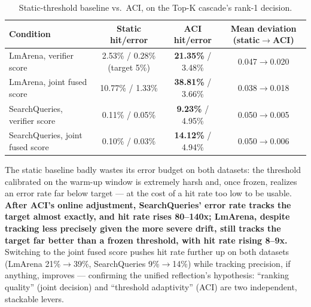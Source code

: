 \documentclass[11pt]{article}
\newenvironment{fittab}{\begin{lrbox}{\fittabbox}}{\end{lrbox}%
  \ifdim\wd\fittabbox>\linewidth\resizebox{\linewidth}{!}{\usebox{\fittabbox}}\else\usebox{\fittabbox}\fi}
\begin{document}
\begin{table}[h]
\centering
\small
\begin{fittab}\begin{tabular}{@{}lccc@{}}
\toprule
\textbf{Condition} & \textbf{Static hit/error} & \textbf{ACI hit/error} & \textbf{Mean deviation (static$\to$ACI)} \\
\midrule
LmArena, verifier score & 2.53\% / 0.28\% (target 5\%) & \textbf{21.35\%} / 3.48\% & 0.047$\to$0.020 \\
LmArena, joint fused score & 10.77\% / 1.33\% & \textbf{38.81\%} / 3.66\% & 0.038$\to$0.018 \\
SearchQueries, verifier score & 0.11\% / 0.05\% & \textbf{9.23\%} / 4.95\% & 0.050$\to$0.005 \\
SearchQueries, joint fused score & 0.10\% / 0.03\% & \textbf{14.12\%} / 4.94\% & 0.050$\to$0.006 \\
\bottomrule
\end{tabular}\end{fittab}
\caption{Static-threshold baseline vs.\ ACI, on the Top-K cascade's rank-1 decision.}
\end{table}

The static baseline badly wastes its error budget on both datasets: the threshold calibrated on the warm-up window is extremely harsh and, once frozen, realizes an error rate far below target --- at the cost of a hit rate too low to be usable. \textbf{After ACI's online adjustment, SearchQueries' error rate tracks the target almost exactly, and hit rate rises 80--140x; LmArena, despite tracking less precisely given the more severe drift, still tracks the target far better than a frozen threshold, with hit rate rising 8--9x.} Switching to the joint fused score pushes hit rate further up on both datasets (LmArena 21\%$\to$39\%, SearchQueries 9\%$\to$14\%) while tracking precision, if anything, improves --- confirming the unified reflection's hypothesis: ``ranking quality'' (joint decision) and ``threshold adaptivity'' (ACI) are two independent, stackable levers.
\end{document}
